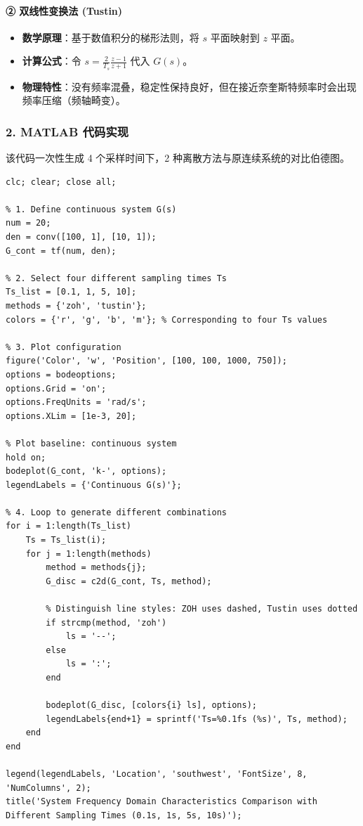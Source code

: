 \documentclass{article}
\begin{document}
\paragraph{② 双线性变换法 (Tustin)}
\begin{itemize}
    \item \textbf{数学原理}：基于数值积分的梯形法则，将 \( s \) 平面映射到 \( z \) 平面。
    \item \textbf{计算公式}：令 \( s = \frac{2}{T_s} \frac{z-1}{z+1} \) 代入 \( G(s) \)。
    \item \textbf{物理特性}：没有频率混叠，稳定性保持良好，但在接近奈奎斯特频率时会出现频率压缩（频轴畸变）。
\end{itemize}

\subsubsection*{2. MATLAB 代码实现}
该代码一次性生成 4 个采样时间下，2 种离散方法与原连续系统的对比伯德图。

\begin{lstlisting}[caption={MATLAB Code for Multi-Sampling Period Discretization Analysis}, label={lst:code1}]
%% Multi-sampling period discretization analysis for control system
clc; clear; close all;

% 1. Define continuous system G(s)
num = 20;
den = conv([100, 1], [10, 1]); 
G_cont = tf(num, den);

% 2. Select four different sampling times Ts
Ts_list = [0.1, 1, 5, 10];  
methods = {'zoh', 'tustin'};
colors = {'r', 'g', 'b', 'm'}; % Corresponding to four Ts values

% 3. Plot configuration
figure('Color', 'w', 'Position', [100, 100, 1000, 750]);
options = bodeoptions;
options.Grid = 'on';
options.FreqUnits = 'rad/s';
options.XLim = [1e-3, 20];

% Plot baseline: continuous system
hold on;
bodeplot(G_cont, 'k-', options); 
legendLabels = {'Continuous G(s)'};

% 4. Loop to generate different combinations
for i = 1:length(Ts_list)
    Ts = Ts_list(i);
    for j = 1:length(methods)
        method = methods{j};
        G_disc = c2d(G_cont, Ts, method);
        
        % Distinguish line styles: ZOH uses dashed, Tustin uses dotted
        if strcmp(method, 'zoh')
            ls = '--';
        else
            ls = ':';
        end
        
        bodeplot(G_disc, [colors{i} ls], options);
        legendLabels{end+1} = sprintf('Ts=%0.1fs (%s)', Ts, method);
    end
end

legend(legendLabels, 'Location', 'southwest', 'FontSize', 8, 'NumColumns', 2);
title('System Frequency Domain Characteristics Comparison with Different Sampling Times (0.1s, 1s, 5s, 10s)');
\end{lstlisting}
\end{document}
